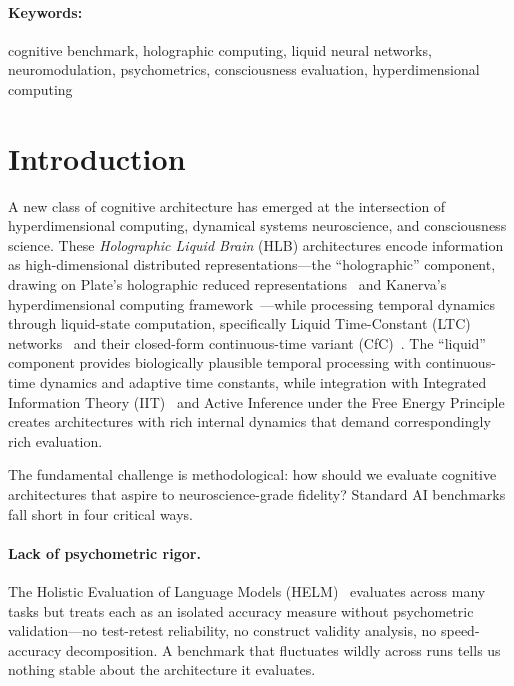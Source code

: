 \documentclass[11pt,letterpaper]{article}
\newcommand{\hlb}{\textsc{HLB}}
\begin{document}
\paragraph{Keywords:} cognitive benchmark, holographic computing, liquid neural networks, neuromodulation, psychometrics, consciousness evaluation, hyperdimensional computing

\section{Introduction}
\label{sec:introduction}

A new class of cognitive architecture has emerged at the intersection of hyperdimensional computing, dynamical systems neuroscience, and consciousness science. These \emph{Holographic Liquid Brain} (\hlb{}) architectures encode information as high-dimensional distributed representations---the ``holographic'' component, drawing on Plate's holographic reduced representations~\citep{plate1995holographic} and Kanerva's hyperdimensional computing framework~\citep{kanerva2009hyperdimensional}---while processing temporal dynamics through liquid-state computation, specifically Liquid Time-Constant (LTC) networks~\citep{hasani2021liquid} and their closed-form continuous-time variant (CfC)~\citep{hasani2022closed}. The ``liquid'' component provides biologically plausible temporal processing with continuous-time dynamics and adaptive time constants, while integration with Integrated Information Theory (IIT)~\citep{tononi2004information,oizumi2014phenomenology} and Active Inference under the Free Energy Principle~\citep{friston2010free,friston2017active} creates architectures with rich internal dynamics that demand correspondingly rich evaluation.

The fundamental challenge is methodological: how should we evaluate cognitive architectures that aspire to neuroscience-grade fidelity? Standard AI benchmarks fall short in four critical ways.

\paragraph{Lack of psychometric rigor.} The Holistic Evaluation of Language Models (HELM)~\citep{liang2023holistic} evaluates across many tasks but treats each as an isolated accuracy measure without psychometric validation---no test-retest reliability, no construct validity analysis, no speed-accuracy decomposition. A benchmark that fluctuates wildly across runs tells us nothing stable about the architecture it evaluates.
\end{document}

